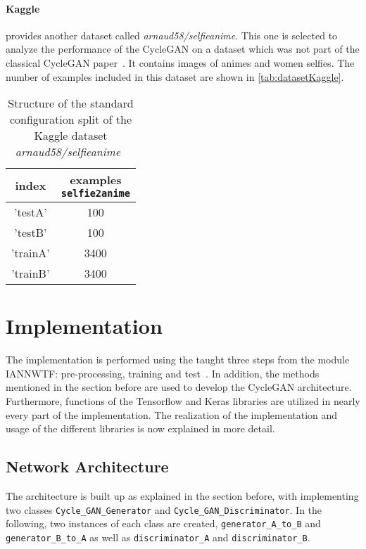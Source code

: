 \documentclass[fleqn,10pt]{SelfArx} %
\begin{document}
\paragraph{Kaggle} provides another dataset called \textit{arnaud58/selfie\-ani\-me}. This one is selected to analyze the performance of the Cycle\ac{GAN} on a dataset which was not part of the classical Cycle\ac{GAN} paper~\cite{image-to-image-ccan}. It contains images of animes and women selfies. The number of examples included in this dataset are shown in \autoref{tab:datasetKaggle}. \cite{kaggle-dataset}

\begin{table}[htb]
\centering
\caption{Structure of the standard configuration split of the Kaggle dataset \textit{arnaud58/selfie\-ani\-me}~\cite{kaggle-dataset}}
\label{tab:datasetKaggle}
\begin{tabular}{c c}
\textbf{index} & \makecell{\textbf{examples} \\ \textbf{\texttt{selfie2anime}}} \\ \hline
'testA' & 100 \\ \hline
'testB' & 100 \\ \hline
'trainA' & 3400 \\ \hline
'trainB' & 3400 \\ \hline
\end{tabular}
\end{table}
\section{Implementation}
The implementation is performed using the taught three steps from the module \ac{IANNWTF}: pre-processing, training and test~\cite{implementingANsCourseware02, implementingANsCourseware03}. In addition, the methods mentioned in the section before are used to develop the Cycle\ac{GAN} architecture. Furthermore, functions of the Tensorflow and Keras libraries are utilized in nearly every part of the implementation. The realization of the implementation and usage of the different libraries is now explained in more detail.

\subsection{Network Architecture}
The architecture is built up as explained in the section before, with implementing two classes \texttt{Cycle\_GAN\_Generator} and  \texttt{Cycle\_GAN\_Discriminator}. In the following, two instances of each class are created, \texttt{generator\_A\_to\_B} and \texttt{generator\_B\_to\_A} as well as \texttt{discriminator\_A} and \texttt{discriminator\_B}.
\end{document}
